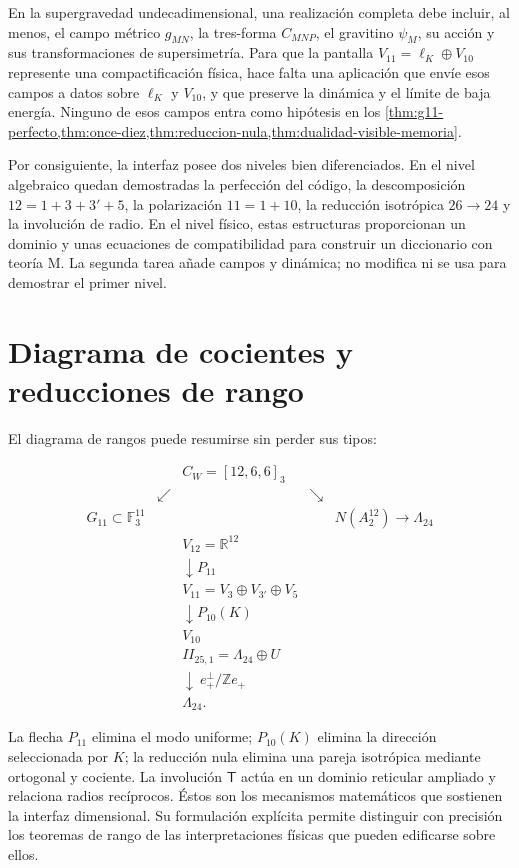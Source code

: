 En la supergravedad undecadimensional, una realización completa debe incluir,
al menos, el campo métrico \(g_{MN}\), la tres-forma \(C_{MNP}\), el
gravitino \(\psi_M\), su acción y sus transformaciones de supersimetría. Para
que la pantalla \(V_{11}=\ell_K\oplus V_{10}\) represente una compactificación
física, hace falta una aplicación que envíe esos campos a datos sobre
\(\ell_K\) y \(V_{10}\), y que preserve la dinámica y el límite de baja
energía. Ninguno de esos campos entra como hipótesis en los
\cref{thm:g11-perfecto,thm:once-diez,thm:reduccion-nula,thm:dualidad-visible-memoria}.

Por consiguiente, la interfaz posee dos niveles bien diferenciados. En el
nivel algebraico quedan demostradas la perfección del código, la
descomposición \(12=1+3+3'+5\), la polarización \(11=1+10\), la reducción
isotrópica \(26\to24\) y la involución de radio. En el nivel físico, estas
estructuras proporcionan un dominio y unas ecuaciones de compatibilidad para
construir un diccionario con teoría M. La segunda tarea añade campos y
dinámica; no modifica ni se usa para demostrar el primer nivel.

\section{Diagrama de cocientes y reducciones de rango}
\label{sec:sintesis-pantallas}

El diagrama de rangos puede resumirse sin perder sus tipos:

\[
\begin{array}{ccccc}
&&C_W=[12,6,6]_3&&\\[1mm]
&\swarrow&&\searrow&\\[-1mm]
G_{11}\subset\mathbb F_3^{11}&&&&N(A_2^{12})\longrightarrow\Lambda_{24}\\[2mm]
&&V_{12}=\mathbb R^{12}&&\\[-1mm]
&&\downarrow P_{11}&&\\[-1mm]
&&V_{11}=V_3\oplus V_{3'}\oplus V_5&&\\[-1mm]
&&\downarrow P_{10}(K)&&\\[-1mm]
&&V_{10}&&\\[2mm]
&&II_{25,1}=\Lambda_{24}\oplus U&&\\[-1mm]
&&\downarrow\ e_+^\perp/\mathbb Ze_+&&\\[-1mm]
&&\Lambda_{24}.&&
\end{array}
\]

La flecha \(P_{11}\) elimina el modo uniforme; \(P_{10}(K)\) elimina la
dirección seleccionada por \(K\); la reducción nula elimina una pareja
isotrópica mediante ortogonal y cociente. La involución
\(\mathsf T\) actúa en un dominio reticular ampliado y relaciona radios
recíprocos. Éstos son los mecanismos matemáticos que sostienen la interfaz
dimensional. Su formulación explícita permite distinguir con precisión los
teoremas de rango de las interpretaciones físicas que pueden edificarse
sobre ellos.
